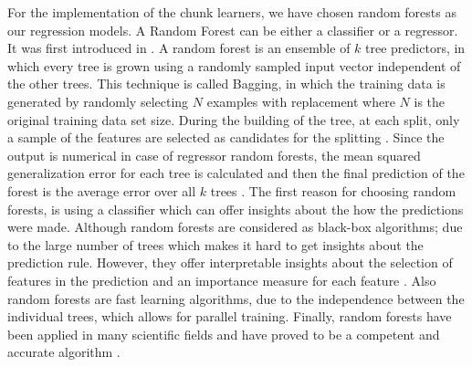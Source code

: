 For the implementation of the chunk learners, we have chosen random forests as our regression models.
A Random Forest can be either a classifier or a regressor. It was first introduced in \cite{breiman2001random}.
A random forest is an ensemble of $k$ tree predictors, in which every tree is grown using a randomly sampled input vector independent of the other trees.
This technique is called Bagging, in which the training data is generated by randomly selecting $N$ examples with replacement where $N$ is the original training data set size.
During the building of the tree, at each split, only a sample of the features are selected as candidates for the splitting \cite{couronne2018random}.
Since the output is numerical in case of regressor random forests, the mean squared generalization error for each tree is calculated and then the final prediction of the forest is the average
error over all $k$ trees \cite{singh2017modelling}.
The first reason for choosing random forests, is using a classifier which can offer insights about the how the predictions were made. 
Although random forests are considered as black-box algorithms; due to the large number of trees which makes it hard to get insights about the prediction rule.
However, they offer interpretable insights about the selection of features in the prediction and an importance measure for each feature \cite{couronne2018random}.
Also random forests are fast learning algorithms, due to the independence between the individual trees, which allows for parallel training.
Finally, random forests have been applied in many scientific fields and have proved to be a competent and accurate algorithm \cite{jog2017random, couronne2018random}.


